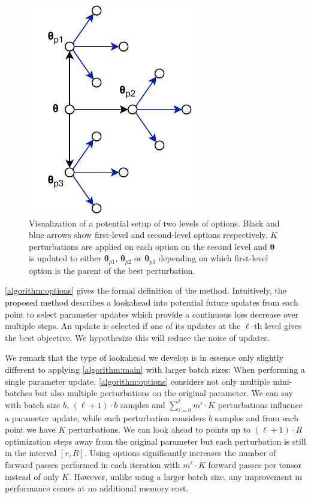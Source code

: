 \begin{figure}
    \centering
    \includegraphics{figures/options.pdf}
    \caption[Visualization of two levels of options]
    {Visualization of a potential setup of 
    two levels of options.
    Black and blue arrows show 
    first-level and second-level options respectively. 
    $K$ perturbations are applied on each option on the 
    second level and $\bm{\theta}$ is updated to 
    either $\bm{\theta}_{p1}$,
    $\bm{\theta}_{p2}$ or $\bm{\theta}_{p3}$
    depending on which
    first-level option is the parent of the 
    best perturbation.
    }
    \label{figure:optionstree}
\end{figure}

\autoref{algorithm:options} gives the formal definition
of the method. 
Intuitively, the proposed method describes 
a lookahead into 
potential future updates from each point to select 
parameter updates 
which provide a continuous loss decrease 
over multiple steps.
An update is selected if one of its updates 
at the $\ell$-th level
gives the best objective. 
We hypothesize this will reduce the noise of
updates.

We remark that the type of lookahead we develop is in 
essence only slightly different to applying 
\autoref{algorithm:main} with larger batch sizes: When 
performing a single parameter update,
\autoref{algorithm:options} considers 
not only multiple mini-batches but also multiple
perturbations on the original parameter. We can say 
with batch size $b$, 
$(\ell+1) \cdot b$
samples and $\sum_{i=0}^\ell m^i \cdot K$ perturbations 
influence a parameter update, while each 
perturbation considers $b$ samples and from each point we 
have $K$ perturbations. We can look ahead to points up to 
$(\ell+1) \cdot R$ optimization steps away from the original parameter 
but each perturbation is still in the interval $[r, R]$.
Using options significantly increases the number 
of forward passes performed in each iteration with
$m^\ell \cdot K$ forward passes per tensor 
instead of only $K$. However, unlike using a larger 
batch size, any improvement in 
performance comes at no additional memory cost.  

